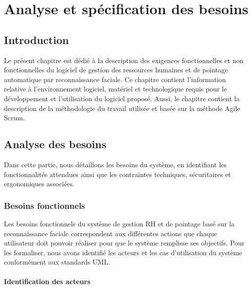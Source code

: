 \chapter{Analyse et spécification des besoins}
\setlength{\intextsep}{8pt}
\setlength{\textfloatsep}{10pt}
\setlength{\floatsep}{8pt}
\setlength{\abovecaptionskip}{4pt}
\setlength{\belowcaptionskip}{2pt}
\setlength{\LTpre}{6pt}
\setlength{\LTpost}{6pt}

\newpage

\section{Introduction}

Le présent chapitre est dédié à la description des exigences fonctionnelles et non
fonctionnelles du logiciel de gestion des ressources humaines et de pointage automatique
par reconnaissance faciale. Ce chapitre contient l'information relative à l'environnement
logiciel, matériel et technologique requis pour le développement et l'utilisation du
logiciel proposé. Aussi, le chapitre contient la description de la méthodologie du travail
utilisée et basée sur la méthode Agile Scrum.

\section{Analyse des besoins}

Dans cette partie, nous détaillons les besoins du système, en identifiant les
fonctionnalités attendues ainsi que les contraintes techniques, sécuritaires et
ergonomiques associées.

\subsection{Besoins fonctionnels}

Les besoins fonctionnels du système de gestion RH et de pointage basé sur la reconnaissance
faciale correspondent aux différentes actions que chaque utilisateur doit pouvoir réaliser
pour que le système remplisse ses objectifs. Pour les formaliser, nous avons identifié les
acteurs et les cas d'utilisation du système conformément aux standards UML.

\subsubsection{Identification des acteurs}

